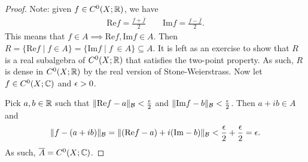 \documentclass{report}
\begin{document}
\begin{proof}
    Note: given $f \in C^0(X; \RR)$, we have 
    \begin{align*}
        \mathrm {Re} f = \frac{f + \overline f}{2} \quad \quad \mathrm{Im} f = \frac{f - \overline f}{2}.
    \end{align*}
    This means that $f \in A \implies \mathrm{Re} f, \mathrm{Im} f \in A$. Then $R = \{\mathrm{Re} f \mid f \in A\} = \{ \mathrm{Im} f \mid f\ \in A\} \subseteq A$. It is left as an exercise to show that $R$ is a real subalgebra of $C^0(X; \RR)$ that satisfies the two-point property. As such, $R$ is dense in $C^0(X; \RR)$ by the real version of Stone-Weierstrass. Now let $f \in C^0(X; \CC)$ and $\epsilon > 0$. 

    Pick $a,b \in \RR$ such that $\Vert \mathrm{Re} f - a \Vert_{\mathcal B} < \frac{\epsilon}{2}$ and $\Vert \mathrm{Im} f - b \Vert_{\mathcal B} < \frac{\epsilon}{2}$. Then $a + ib \in A$ and 
    \begin{align*}
        \Vert f - (a + ib) \Vert_{\mathcal B} = \Vert (\mathrm{Re}f - a) + i(\mathrm{Im} - b) \Vert_{\mathcal B} < \frac{\epsilon}{2} + \frac{\epsilon}{2} = \epsilon.
    \end{align*}
    As such, $\overline A = C^0(X; \CC)$.
\end{proof}
\end{document}
